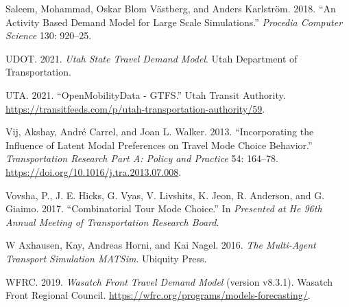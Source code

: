 \documentclass[12pt, oneside, openright]{byuthesis}
\newlength{\cslhangindent}
\newlength{\cslentryspacingunit} %
\newenvironment{CSLReferences}[2] %
 {%
  \setlength{\parindent}{0pt}
  \ifodd #1
  \let\oldpar\par
  \def\par{\hangindent=\cslhangindent\oldpar}
  \fi
  \setlength{\parskip}{#2\cslentryspacingunit}
 }%
 {}
\begin{document}
\begin{CSLReferences}{1}{0}
\leavevmode{}%
Saleem, Mohammad, Oskar Blom Västberg, and Anders Karlström. 2018. {``An Activity Based Demand Model for Large Scale Simulations.''} \emph{Procedia Computer Science} 130: 920--25.

\leavevmode{}%
UDOT. 2021. \emph{Utah State Travel Demand Model}. Utah Department of Transportation.

\leavevmode{}%
UTA. 2021. {``OpenMobilityData - GTFS.''} Utah Transit Authority. \url{https://transitfeeds.com/p/utah-transportation-authority/59}.

\leavevmode{}%
Vij, Akshay, André Carrel, and Joan L. Walker. 2013. {``Incorporating the Influence of Latent Modal Preferences on Travel Mode Choice Behavior.''} \emph{Transportation Research Part A: Policy and Practice} 54: 164--78. \url{https://doi.org/10.1016/j.tra.2013.07.008}.

\leavevmode{}%
Vovsha, P., J. E. Hicks, G. Vyas, V. Livshits, K. Jeon, R. Anderson, and G. Giaimo. 2017. {``Combinatorial Tour Mode Choice.''} In \emph{Presented at He 96th Annual Meeting of Transportation Research Board}.

\leavevmode{}%
W Axhausen, Kay, Andreas Horni, and Kai Nagel. 2016. \emph{The Multi-Agent Transport Simulation MATSim}. Ubiquity Press.

\leavevmode{}%
WFRC. 2019. \emph{Wasatch Front Travel Demand Model} (version v8.3.1). Wasatch Front Regional Council. \url{https://wfrc.org/programs/models-forecasting/}.

\end{CSLReferences}


\end{document}
